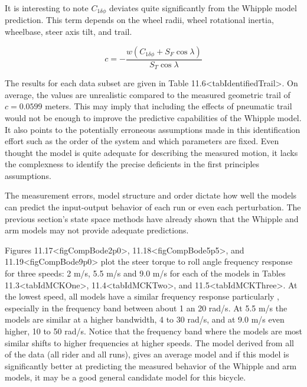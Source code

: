 \documentclass[a4paper]{article}
\begin{document}
It is interesting to note $C_{1 \delta \phi}$ deviates quite
significantly from the Whipple model prediction. This term depends on
the wheel radii, wheel rotational inertia, wheelbase, steer axis tilt,
and trail. 

\[c = -\frac{w(C_{1 \delta \phi} + S_F \operatorname{cos}\lambda)}{S_T
\operatorname{cos}\lambda}\]

The results for each data subset are given in Table
11.6\textless{}tabIdentifiedTrail\textgreater{}. On average, the values
are unrealistic compared to the measured geometric trail
of $c=0.0599$ meters. This may imply that including the effects of
pneumatic trail would not be enough to improve the predictive
capabilities of the Whipple model. It also points to the potentially
erroneous assumptions made in this identification effort such as the
order of the system and which parameters are fixed. Even thought the
model is quite adequate for describing the measured motion, it lacks the
complexness to identify the precise deficients in the first principles
assumptions.

The measurement errors, model structure and order dictate how well the
models can predict the input-output behavior of each run or even each
perturbation. The previous section's state space methods have already 
shown that the Whipple and arm models may not provide adequate predictions.

Figures 11.17\textless{}figCompBode2p0\textgreater{},
11.18\textless{}figCompBode5p5\textgreater{}, and
11.19\textless{}figCompBode9p0\textgreater{} plot the steer torque to
roll angle frequency response for three speeds: 2 m/s, 5.5 m/s and 9.0
m/s for each of the models in Tables
11.3\textless{}tabIdMCKOne\textgreater{},
11.4\textless{}tabIdMCKTwo\textgreater{}, and
11.5\textless{}tabIdMCKThree\textgreater{}. At the lowest speed, all models 
have a similar frequency response particularly , especially in the
frequency band between about 1 an 20 rad/s. At 5.5 m/s the models are
similar at a higher bandwidth, 4 to 30 rad/s, and at 9.0 m/s even
higher, 10 to 50 rad/s. Notice that the frequency band where the models
are most similar shifts to higher frequencies at higher speeds. The
model derived from all of the data (all rider and all runs), gives an
average model and if this model is significantly better at predicting
the measured behavior of the Whipple and arm models, it may be a good
general candidate model for this bicycle.

\end{document}
